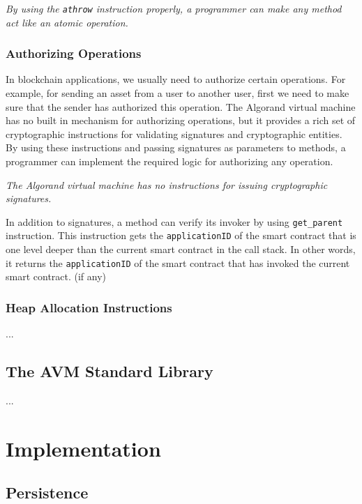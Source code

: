\documentclass[11pt, A4]{report}
\begin{document}
    \emph{By using the \texttt{athrow} instruction properly, a programmer can make any method act like an atomic
    operation.}

    \subsection{Authorizing Operations}\label{subsec:authorizing-operations}

    In blockchain applications, we usually need to authorize certain operations. For example, for sending an asset
    from a user to another user, first we need to make sure that the sender has authorized this operation. The
    Algorand virtual machine has no built in mechanism for authorizing operations, but it provides a rich set of
    cryptographic instructions for validating signatures and cryptographic entities. By using these instructions and
    passing signatures as parameters to methods, a programmer can implement the required logic for authorizing any
    operation.

    \emph{The Algorand virtual machine has no instructions for issuing cryptographic signatures.}

    In addition to signatures, a method can verify its invoker by using \texttt{get\_parent} instruction. This
    instruction gets the \texttt{applicationID} of the smart contract that is one level deeper than the current
    smart contract in the call stack. In other words, it returns the \texttt{applicationID} of the smart contract that
    has invoked the current smart contract. (if any)

    \subsection{Heap Allocation Instructions}\label{subsec:heap-allocation-instructions}

    ...


    \section{The AVM Standard Library}\label{sec:the-avm-standard-library}

    ...


    \chapter{Implementation}\label{ch:implementation}


    \section{Persistence}\label{sec:persistence}
\end{document}
